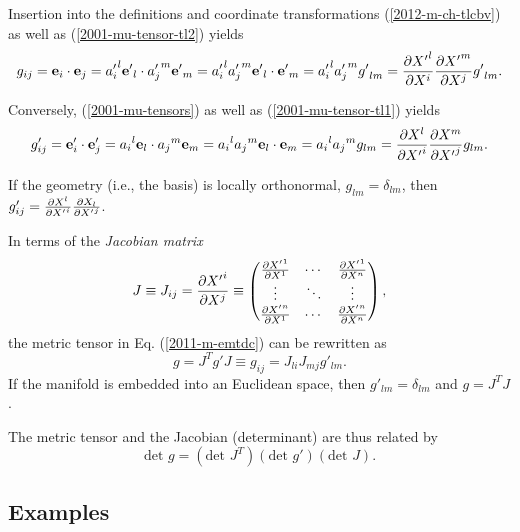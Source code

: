 Insertion into the definitions and coordinate transformations
(\ref{2012-m-ch-tlcbv}) as well as      (\ref{2001-mu-tensor-tl2})
yields
\begin{equation}
g_{ij}={\bf e}_i\cdot {\bf e}_j
={a'_i}^l{\bf e'}_l\cdot {a'_j}^m{\bf e'}_m
={a'_i}^l {a'_j}^m {\bf e'}_l\cdot {\bf e'}_m
= {a'_i}^l {a'_j}^m {g'}_{lm}
= {\partial {X'}^l\over \partial X^i}{\partial {X'}^m\over \partial X^j} {g'}_{lm}
.
\label{2011-m-emtdc}
\end{equation}

Conversely,  (\ref{2001-mu-tensors}) as well as    (\ref{2001-mu-tensor-tl1})
yields
\begin{equation}
g'_{ij}={\bf e}'_i\cdot {\bf e}'_j
={a_i}^l{\bf e}_l\cdot {a_j}^m{\bf e}_m
={a_i}^l {a_j}^m {\bf e}_l\cdot {\bf e}_m
= {a_i}^l {a_j}^m {g}_{lm}
= {\partial {X}^l\over \partial {X'}^i}{\partial {X}^m\over \partial {X'}^j} {g}_{lm}
.
\end{equation}


If the geometry (i.e., the basis) is locally orthonormal, ${g}_{lm}=\delta_{lm}$,
then
$g'_{ij}={\partial {X}^l\over \partial {X'}^i}{\partial {X}_l\over \partial {X'}^j}$.


In terms of the
{\em  Jacobian matrix}
\begin{equation}
J\equiv
J_{ij}={\partial {X'}^i\over \partial {X}^j }
\equiv
\begin{pmatrix}
{\partial {X'}^1\over \partial {X}^1}&\cdots&{\partial {X'}^1\over \partial {X}^n}\\
\vdots&\ddots &\vdots\\
{\partial {X'}^n\over \partial {X}^1}&\cdots&{\partial {X'}^n\over \partial {X}^n}
\end{pmatrix} ,
\label{2013-m-t-jm}
\end{equation}
the metric tensor in Eq. (\ref{2011-m-emtdc})
can be rewritten as
\begin{equation}
g = J^T g' J
\equiv g_{ij}= J_{li}J_{mj}g'_{lm}
.
\label{2011-m-emtdcJ}
\end{equation}
If the manifold is embedded into an Euclidean space,
then $g'_{lm}=\delta_{lm}$
and  $g = J^T  J $.

The metric tensor and the Jacobian (determinant)
are thus related by
\begin{equation}
\textrm{det }g = (\textrm{det }J^T) (\textrm{det } g')(\textrm{det } J)
.
\label{2011-m-emtdcJd}
\end{equation}

\subsection{Examples}

